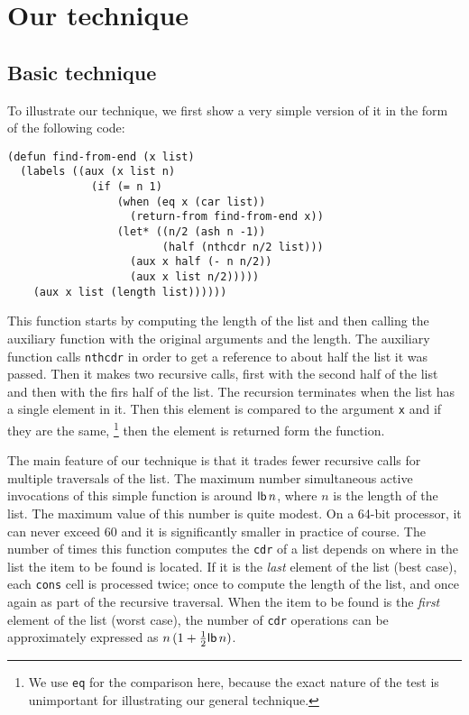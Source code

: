\section{Our technique}

\subsection{Basic technique}

To illustrate our technique, we first show a very simple version of it
in the form of the following code:

{\small\begin{verbatim}
(defun find-from-end (x list)
  (labels ((aux (x list n)
             (if (= n 1)
                 (when (eq x (car list))
                   (return-from find-from-end x))
                 (let* ((n/2 (ash n -1))
                        (half (nthcdr n/2 list)))
                   (aux x half (- n n/2))
                   (aux x list n/2)))))
    (aux x list (length list))))))
\end{verbatim}}

This function starts by computing the length of the list and then
calling the auxiliary function with the original arguments and the
length.  The auxiliary function calls \texttt{nthcdr} in order to get
a reference to about half the list it was passed.  Then it makes two
recursive calls, first with the second half of the list and then with
the firs half of the list.  The recursion terminates when the list has
a single element in it.  Then this element is compared to the argument
\texttt{x} and if they are the same,%
\footnote{We use \texttt{eq} for the comparison here, because the
  exact nature of the test is unimportant for illustrating our general
  technique.}
then the element is returned form the function.

The main feature of our technique is that it trades fewer recursive
calls for multiple traversals of the list.  The maximum number%
simultaneous active invocations of this simple function is around
$\mathsf{lb}\thinspace n$, where $n$ is the length of the list.  The
maximum value of this number is quite modest.  On a 64-bit processor,
it can never exceed $60$ and it is significantly smaller in practice
of course.  The number of times this function computes the
\texttt{cdr} of a list depends on where in the list the item to be
found is located.  If it is the \emph{last} element of the list (best
case), each \texttt{cons} cell is processed twice; once to compute the
length of the list, and once again as part of the recursive traversal.
When the item to be found is the \emph{first} element of the list
(worst case), the number of \texttt{cdr} operations can be
approximately expressed as $n\thinspace (1 +
\frac{1}{2}\mathsf{lb}\thinspace n)$.

